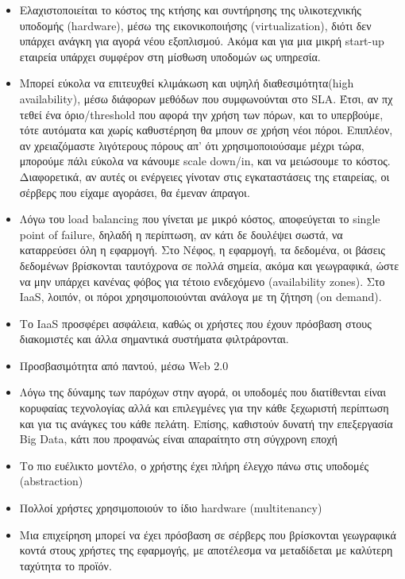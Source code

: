 \documentclass{article}
\begin{document}
\begin{itemize}
\item Eλαχιστοποιείται το κόστος της κτήσης και συντήρησης της υλικοτεχνικής υποδομής (hardware), μέσω της εικονικοποιήσης (virtualization), διότι δεν υπάρχει ανάγκη για αγορά νέου εξοπλισμού. Ακόμα και για μια μικρή start-up εταιρεία υπάρχει συμφέρον  στη μίσθωση υποδομών ως υπηρεσία.
\item Μπορεί εύκολα να επιτευχθεί κλιμάκωση και υψηλή διαθεσιμότητα(high availability), μέσω διάφορων μεθόδων που συμφωνούνται στο SLA. Έτσι, αν πχ τεθεί ένα όριο/threshold που αφορά την χρήση των πόρων, και το υπερβούμε, τότε αυτόματα και χωρίς καθυστέρηση θα μπουν σε χρήση νέοι πόροι. Επιπλέον, αν χρειαζόμαστε λιγότερους πόρους  απ’ ότι χρησιμοποιούσαμε μέχρι τώρα, μπορούμε πάλι εύκολα να κάνουμε scale down/in, και να μειώσουμε το κόστος. Διαφορετικά, αν αυτές οι ενέργειες γίνοταν στις εγκαταστάσεις της εταιρείας, οι σέρβερς που είχαμε αγοράσει, θα έμεναν άπραγοι.
\item Λόγω του load balancing που γίνεται με μικρό κόστος, αποφεύγεται το single point of failure, δηλαδή η περίπτωση, αν κάτι δε δουλέψει σωστά, να καταρρεύσει όλη η εφαρμογή. Στο Νέφος, η εφαρμογή, τα δεδομένα, οι βάσεις δεδομένων βρίσκονται ταυτόχρονα σε πολλά σημεία, ακόμα και γεωγραφικά, ώστε να μην υπάρχει κανένας φόβος για τέτοιο ενδεχόμενο (availability zones).
Στο IaaS, λοιπόν, οι πόροι χρησιμοποιούνται ανάλογα με τη ζήτηση (on demand).
\item Το IaaS προσφέρει ασφάλεια, καθώς οι χρήστες που έχουν πρόσβαση στους διακομιστές και άλλα σημαντικά συστήματα φιλτράρονται.
\item Προσβασιμότητα από παντού, μέσω Web 2.0
\item Λόγω της δύναμης των παρόχων στην αγορά, οι υποδομές που διατίθενται είναι κορυφαίας τεχνολογίας αλλά και επιλεγμένες για την κάθε ξεχωριστή περίπτωση και για τις ανάγκες του κάθε πελάτη. Επίσης, καθιστούν δυνατή την επεξεργασία Big Data, κάτι που προφανώς είναι απαραίτητο στη σύγχρονη εποχή
\item Το πιο ευέλικτο μοντέλο, ο χρήστης έχει πλήρη έλεγχο πάνω στις υποδομές (abstraction)
\item Πολλοί χρήστες χρησιμοποιούν το ίδιο hardware (multitenancy)
\item Μια επιχείρηση μπορεί να έχει πρόσβαση σε σέρβερς που βρίσκονται γεωγραφικά κοντά στους χρήστες της εφαρμογής, με αποτέλεσμα να μεταδίδεται με καλύτερη ταχύτητα το προϊόν.
\end{itemize}
\end{document}
